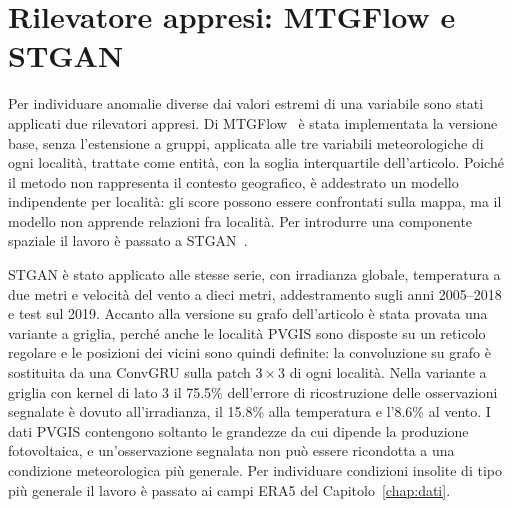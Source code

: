 \section{Rilevatore appresi: MTGFlow e STGAN}
\label{app:pvgis-rilevatore}

Per individuare anomalie diverse dai valori estremi di una variabile sono stati applicati due rilevatori appresi. Di MTGFlow~\cite{zhou2023labelfree} è stata implementata la versione base, senza l'estensione a gruppi, applicata alle tre variabili meteorologiche di ogni località, trattate come entità, con la soglia interquartile dell'articolo. Poiché il metodo non rappresenta il contesto geografico, è addestrato un modello indipendente per località: gli score possono essere confrontati sulla mappa, ma il modello non apprende relazioni fra località. Per introdurre una componente spaziale il lavoro è passato a STGAN~\cite{deng2022stgan}.

STGAN è stato applicato alle stesse serie, con irradianza globale, temperatura a due metri e velocità del vento a dieci metri, addestramento sugli anni 2005--2018 e test sul 2019. Accanto alla versione su grafo dell'articolo è stata provata una variante a griglia, perché anche le località PVGIS sono disposte su un reticolo regolare e le posizioni dei vicini sono quindi definite: la convoluzione su grafo è sostituita da una ConvGRU sulla patch $3\times3$ di ogni località. Nella variante a griglia con kernel di lato 3 il 75.5\% dell'errore di ricostruzione delle osservazioni segnalate è dovuto all'irradianza, il 15.8\% alla temperatura e l'8.6\% al vento. I dati PVGIS contengono soltanto le grandezze da cui dipende la produzione fotovoltaica, e un'osservazione segnalata non può essere ricondotta a una condizione meteorologica più generale. Per individuare condizioni insolite di tipo più generale il lavoro è passato ai campi ERA5 del Capitolo~\ref{chap:dati}.
